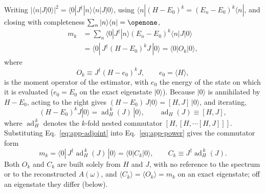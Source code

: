 \documentclass[aps,prb,onecolumn,superscriptaddress,longbibliography,floatfix]{revtex4-2}
\begin{document}
Writing $|\langle n|J|0\rangle|^2=\langle 0|J^\dagger|n\rangle\langle n|J|0\rangle$, using $\langle n|(H-E_0)^k=(E_n-E_0)^k\langle n|$, and closing with completeness $\sum_n|n\rangle\langle n|=\openone$,
\begin{equation}
\begin{aligned}
m_k&=\sum_n\langle 0|J^\dagger|n\rangle(E_n-E_0)^k\langle n|J|0\rangle\\
&=\langle 0|\,J^\dagger(H-E_0)^kJ\,|0\rangle=\langle 0|O_k|0\rangle ,
\end{aligned}
\label{eq:app-power}
\end{equation}
where
\[
O_k\equiv J^\dagger(H-e_0)^kJ,\qquad e_0=\langle H\rangle ,
\]
is the moment operator of the estimator, with $e_0$ the energy of the state on which it is evaluated ($e_0=E_0$ on the exact eigenstate $|0\rangle$). Because $|0\rangle$ is annihilated by $H-E_0$, acting to the right gives $(H-E_0)\,J|0\rangle=[H,J]\,|0\rangle$, and iterating,
\begin{equation}
(H-E_0)^k J|0\rangle=\operatorname{ad}_H^{\,k}(J)\,|0\rangle,\qquad \operatorname{ad}_H(J)\equiv[H,J],
\label{eq:app-adjoint}
\end{equation}
where $\operatorname{ad}_H^{\,k}$ denotes the $k$-fold nested commutator $[H,[H,\cdots[H,J]]]$. Substituting Eq.~\eqref{eq:app-adjoint} into Eq.~\eqref{eq:app-power} gives the commutator form
\begin{equation}
m_k=\langle 0|\,J^\dagger\operatorname{ad}_H^{\,k}(J)\,|0\rangle=\langle 0|C_k|0\rangle,\qquad C_k\equiv J^\dagger\operatorname{ad}_H^{\,k}(J).
\label{eq:app-commutator}
\end{equation}
Both $O_k$ and $C_k$ are built solely from $H$ and $J$, with no reference to the spectrum or to the reconstructed $A(\omega)$, and $\langle C_k\rangle=\langle O_k\rangle=m_k$ on an exact eigenstate; off an eigenstate they differ (below).
\end{document}
